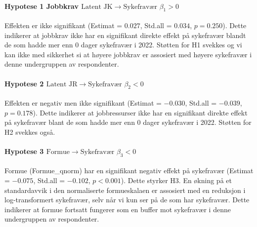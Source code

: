 \documentclass[
  12pt,
  a4paper,
  DIV=11,
  numbers=noendperiod]{scrartcl}
\let\oldparagraph\paragraph
\renewcommand{\paragraph}[1]{\oldparagraph{#1}\mbox{}}
\begin{document}
\paragraph{\texorpdfstring{Hypotese 1 Jobbkrav
\(\text{Latent JK} \rightarrow \text{Sykefravær } \beta_1 > 0\)}{Hypotese 1 Jobbkrav \textbackslash text\{Latent JK\} \textbackslash rightarrow \textbackslash text\{Sykefravær \} \textbackslash beta\_1 \textgreater{} 0}}\label{hypotese-1-jobbkrav-textlatent-jk-rightarrow-textsykefravuxe6r-beta_1-0-1}

Effekten er ikke signifikant (Estimat = \(0.027\), Std.all = \(0.034\),
\(p = 0.250\)). Dette indikerer at jobbkrav ikke har en signifikant
direkte effekt på sykefravær blandt de som hadde mer enn 0 dager
sykefravær i 2022. Støtten for H1 svekkes og vi kan ikke med sikkerhet
si at høyere jobbkrav er assosiert med høyere sykefravær i denne
undergruppen av respondenter.

\paragraph{\texorpdfstring{Hypotese 2
\(\text{Latent JR} \rightarrow \text{Sykefravær } \beta_2 < 0\)}{Hypotese 2 \textbackslash text\{Latent JR\} \textbackslash rightarrow \textbackslash text\{Sykefravær \} \textbackslash beta\_2 \textless{} 0}}\label{hypotese-2-textlatent-jr-rightarrow-textsykefravuxe6r-beta_2-0-1}

Effekten er negativ men ikke signifikant (Estimat = \(-0.030\), Std.all
= \(-0.039\), \(p = 0.178\)). Dette indikerer at jobbressurser ikke har
en signifikant direkte effekt på sykefravær blant de som hadde mer enn 0
dager sykefravær i 2022. Støtten for H2 svekkes også.

\paragraph{\texorpdfstring{Hypotese 3
\(\text{Formue} \rightarrow \text{Sykefravær } \beta_3 < 0\)}{Hypotese 3 \textbackslash text\{Formue\} \textbackslash rightarrow \textbackslash text\{Sykefravær \} \textbackslash beta\_3 \textless{} 0}}\label{hypotese-3-textformue-rightarrow-textsykefravuxe6r-beta_3-0-1}

Formue (Formue\_qnorm) har en signifikant negativ effekt på sykefravær
(Estimat = \(-0.075\), Std.all = \(-0.102\), \(p < 0.001\)). Dette
styrker H3. En økning på et standardavvik i den normaliserte
formueskalaen er assosiert med en reduksjon i log-transformert
sykefravær, selv når vi kun ser på de som har sykefravær. Dette
indikerer at formue fortsatt fungerer som en buffer mot sykefravær i
denne undergruppen av respondenter.
\end{document}
